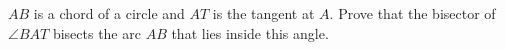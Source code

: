 $AB$ is a chord of a circle and $AT$ is the tangent at $A$. Prove that the bisector of $\angle BAT$ bisects the arc $AB$ that lies inside this angle.
